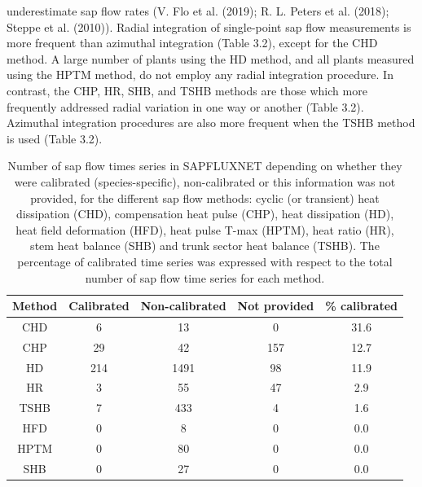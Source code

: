 \documentclass[11pt,twoside]{reedthesis}
\begin{document}
underestimate sap flow rates (V. Flo et al. (2019); R. L. Peters et al.
(2018); Steppe et al. (2010)). Radial integration of single-point sap
flow measurements is more frequent than azimuthal integration (Table
3.2), except for the CHD method. A large number of plants using the HD
method, and all plants measured using the HPTM method, do not employ any
radial integration procedure. In contrast, the CHP, HR, SHB, and TSHB
methods are those which more frequently addressed radial variation in
one way or another (Table 3.2). Azimuthal integration procedures are
also more frequent when the TSHB method is used (Table 3.2).\par
\begin{table}[!h]

\caption[Number of sap flow times series in SAPFLUXNET depending on whether they were calibrated for the different sap flow methods.]{\label{tab:Ch3T1}Number of sap flow times series in SAPFLUXNET depending on whether they were calibrated (species-specific), non-calibrated or this information was not provided, for the different sap flow methods: cyclic (or transient) heat dissipation (CHD), compensation heat pulse (CHP), heat dissipation (HD), heat field deformation (HFD), heat pulse T-max (HPTM), heat ratio (HR), stem heat balance (SHB) and trunk sector heat balance (TSHB). The percentage of calibrated time series was expressed with respect to the total number of sap flow time series for each method.}
\centering
\fontsize{10}{12}\selectfont
\begin{tabular}[t]{ccccc}
\toprule
Method & Calibrated & Non-calibrated & Not provided & \% calibrated\\
\midrule
CHD & 6 & 13 & 0 & 31.6\\
CHP & 29 & 42 & 157 & 12.7\\
HD & 214 & 1491 & 98 & 11.9\\
HR & 3 & 55 & 47 & 2.9\\
TSHB & 7 & 433 & 4 & 1.6\\
HFD & 0 & 8 & 0 & 0.0\\
HPTM & 0 & 80 & 0 & 0.0\\
SHB & 0 & 27 & 0 & 0.0\\
\bottomrule
\end{tabular}
\end{table}
\end{document}
